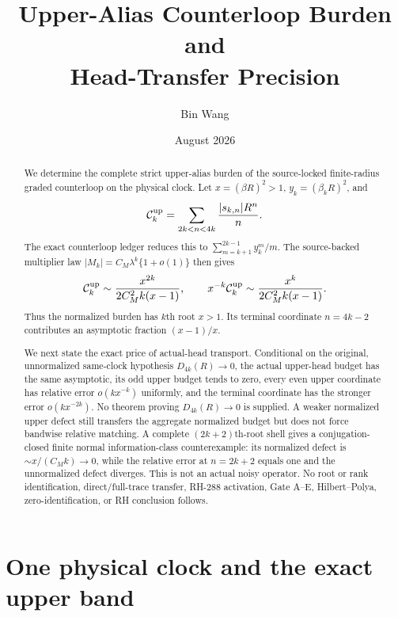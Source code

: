 \documentclass[11pt]{article}
\title{Upper-Alias Counterloop Burden and\\Head-Transfer Precision}
\author{Bin Wang}
\date{August 2026}
\theoremstyle{remark}
\begin{document}
\maketitle

\begin{abstract}
We determine the complete strict upper-alias burden of the source-locked
finite-radius graded counterloop on the physical clock.  Let
$x=(\beta R)^2>1$, $y_k=(\beta_kR)^2$, and
\[
 \mathcal C_k^{\rm up}
 =\sum_{2k<n<4k}\frac{|s_{k,n}|R^n}{n}.
\]
The exact counterloop ledger reduces this to
$\sum_{m=k+1}^{2k-1}y_k^m/m$.  The source-backed multiplier law
$|M_k|=C_M\lambda^k\{1+o(1)\}$ then gives
\[
 \mathcal C_k^{\rm up}
 \sim\frac{x^{2k}}{2C_M^2k(x-1)},\qquad
 x^{-k}\mathcal C_k^{\rm up}
 \sim\frac{x^k}{2C_M^2k(x-1)}.
\]
Thus the normalized burden has $k$th root $x>1$.  Its terminal coordinate
$n=4k-2$ contributes an asymptotic fraction $(x-1)/x$.

We next state the exact price of actual-head transport.  Conditional on the
original, unnormalized same-clock hypothesis $D_{4k}(R)\to0$, the actual
upper-head budget has the same asymptotic, its odd upper budget tends to
zero, every even upper coordinate has relative error
$o(kx^{-k})$ uniformly, and the terminal coordinate has the stronger error
$o(kx^{-2k})$.  No theorem proving $D_{4k}(R)\to0$ is supplied.  A weaker
normalized upper defect still transfers the aggregate normalized budget but
does not force bandwise relative matching.  A complete
$(2k+2)$th-root shell gives a conjugation-closed finite normal
information-class counterexample: its normalized defect is
$\sim x/(C_Mk)\to0$, while the relative error at $n=2k+2$ equals one and
the unnormalized defect diverges.  This is not an actual noisy operator.
No root or rank identification, direct/full-trace transfer, RH-288
activation, Gate A--E, Hilbert--Polya, zero-identification, or RH conclusion
follows.
\end{abstract}

\section{One physical clock and the exact upper band}
\end{document}
